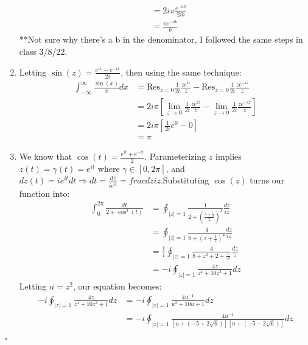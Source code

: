 \documentclass[11pt]{article}
\newenvironment{proof}{\noindent{\bf Proof.}}{\hfill $\square$\medskip}
\begin{document}
\begin{proof}
\begin{enumerate}[label=\textbf{(\alph*)}]
\begin{equation}
\begin{split}
                &=2i\pi\frac{e^{-ab}}{2ib}\\
                &=\frac{\pi e^{-ab}}{b}
            \end{split}
        \end{equation}
        **Not sure why there's a b in the denominator, I followed the same steps in class 3/8/22.
        \item Letting $\sin(z)=\frac{e^{ix}-e^{-ix}}{2i}$, then using the same technique:
        \begin{equation}
            \begin{split}
                \int_{-\infty}^{\infty}\frac{\sin(x)}{x}dx&=\text{Res}_{z=0}\frac{1}{2i}\frac{ze^{iz}}{z}-\text{Res}_{z=0}\frac{1}{2i}\frac{ze^{-iz}}{z}\\
                &=2i\pi\left[\lim_{z\to0}\frac{1}{2i}\frac{ze^{iz}}{z}-\lim_{z\to0}\frac{1}{2i}\frac{ze^{-iz}}{z}\right]\\
                &=2i\pi\left[\frac{1}{2i}e^{0}-0\right]\\
                &=\pi
            \end{split}
        \end{equation}
        \item We know that $\cos(t)=\frac{e^{it}+e^{-it}}{2}$. Parameterizing $z$ implies $z(t)=\gamma(t)=e^{it}$ where $\gamma\in[0,2\pi]$, and $dz(t)=ie^{it}dt\Rightarrow dt=\frac{dz}{ie^{it}}=frac{dz}{iz}$.Substituting $\cos(z)$ turns our function into:
        \begin{equation}
            \begin{split}
                \int_{0}^{2\pi}\frac{dt}{2+\cos^{2}(t)}&=\oint_{\left|z\right|=1}\frac{1}{2+\left(\frac{z+\frac{1}{z}}{2}\right)^{2}}\frac{dz}{iz}\\
                &=\oint_{|z|=1}\frac{4}{8+\left(z+\frac{1}{z}\right)^{2}}\frac{dz}{iz}\\
                &=\frac{1}{i}\oint_{|z|=1}\frac{4}{8+z^{2}+2+\frac{1}{z^{2}}}\frac{dz}{z}\\
                &=-i\oint_{|z|=1}\frac{4z}{z^{4}+10z^{2}+1}dz
            \end{split}
        \end{equation}
        Letting $u=z^{2}$, our equation becomes:
        \begin{equation}
            \begin{split}
                -i\oint_{|z|=1}\frac{4z}{z^{4}+10z^{2}+1}dz&=-i\oint_{|z|=1}\frac{4u^{-1}}{u^{2}+10u+1}dz\\
                &=-i\oint_{|z|=1}\frac{4u^{-1}}{[u+(-5+2\sqrt{6})][u+(-5-2\sqrt{6})]}dz
            \end{split}
        \end{equation}
    \end{enumerate}
\end{proof}
\end{document}
